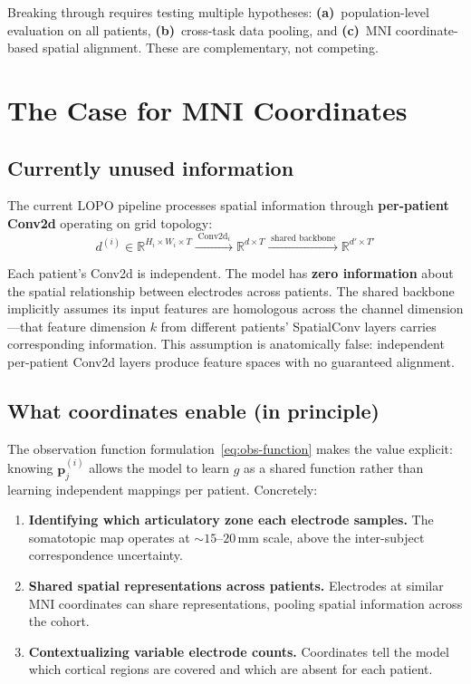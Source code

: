 \documentclass[11pt,letterpaper]{article}
\newcommand{\bfp}{\mathbf{p}}
\newcommand{\R}{\mathbb{R}}
\begin{document}
Breaking through requires testing multiple hypotheses: \textbf{(a)}~population-level evaluation on all patients, \textbf{(b)}~cross-task data pooling, and \textbf{(c)}~MNI coordinate-based spatial alignment. These are complementary, not competing.


\section{The Case for MNI Coordinates}

\subsection{Currently unused information}

The current LOPO pipeline processes spatial information through \textbf{per-patient Conv2d} operating on grid topology:
\[
d^{(i)} \in \R^{H_i \times W_i \times T}
\xrightarrow{\;\text{Conv2d}_i\;}
\R^{d \times T}
\xrightarrow{\;\text{shared backbone}\;}
\R^{d' \times T'}
\]

Each patient's Conv2d is independent. The model has \textbf{zero information} about the spatial relationship between electrodes across patients. The shared backbone implicitly assumes its input features are homologous across the channel dimension---that feature dimension $k$ from different patients' SpatialConv layers carries corresponding information. This assumption is anatomically false: independent per-patient Conv2d layers produce feature spaces with no guaranteed alignment.

\subsection{What coordinates enable (in principle)}

The observation function formulation~\eqref{eq:obs-function} makes the value explicit: knowing $\bfp_j^{(i)}$ allows the model to learn $g$ as a shared function rather than learning independent mappings per patient. Concretely:

\begin{enumerate}[leftmargin=2em]
\item \textbf{Identifying which articulatory zone each electrode samples.} The somatotopic map operates at ${\sim}15$--$20$\,mm scale, above the inter-subject correspondence uncertainty.
\item \textbf{Shared spatial representations across patients.} Electrodes at similar MNI coordinates can share representations, pooling spatial information across the cohort.
\item \textbf{Contextualizing variable electrode counts.} Coordinates tell the model which cortical regions are covered and which are absent for each patient.
\end{enumerate}
\end{document}
